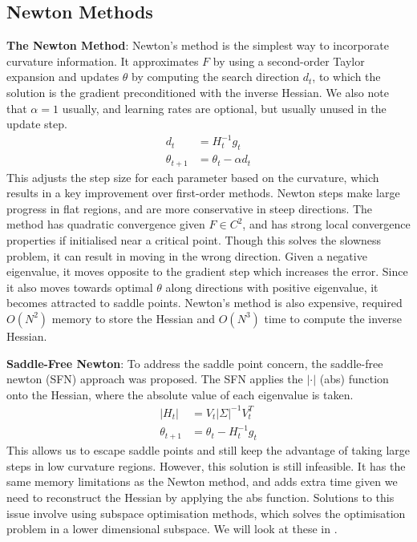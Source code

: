 \subsection{Newton Methods}
\textbf{The Newton Method}: Newton's method is the simplest way to incorporate curvature information. It approximates $F$ by using a second-order Taylor expansion and updates $\theta$ by computing the search direction $d_t$, to which the solution is the gradient preconditioned with the inverse Hessian. We also note that $\alpha = 1$ usually, and learning rates are optional, but usually unused in the update step.
\begin{align}
    d_t &= H_t^{-1} g_t \\
    \theta_{t+1} &= \theta_t - \alpha d_t
\end{align}
This adjusts the step size for each parameter based on the curvature, which results in a key improvement over first-order methods. Newton steps make large progress in flat regions, and are more conservative in steep directions. The method has quadratic convergence given $F \in C^{2}$, and has strong local convergence properties if initialised near a critical point. Though this solves the slowness problem, it can result in moving in the wrong direction. Given a negative eigenvalue, it moves opposite to the gradient step which increases the error. Since it also moves towards optimal $\theta$ along directions with positive eigenvalue, it becomes attracted to saddle points.
Newton's method is also expensive, required $O(N^2)$ memory to store the Hessian and $O(N^3)$ time to compute the inverse Hessian.

\textbf{Saddle-Free Newton}: To address the saddle point concern, the saddle-free newton (SFN) approach was proposed. The SFN applies the $|\cdot|$ (abs) function onto the Hessian, where the absolute value of each eigenvalue is taken.
\begin{align}
    |H_t| &= V_{t} |\Sigma|^{-1} V_{t}^T \\
    \theta_{t+1} &= \theta_t - H_t^{-1} g_t
\end{align}
This allows us to escape saddle points and still keep the advantage of taking large steps in low curvature regions. However, this solution is still infeasible. It has the same memory limitations as the Newton method, and adds extra time given we need to reconstruct the Hessian by applying the abs function. Solutions to this issue involve using subspace optimisation methods, which solves the optimisation problem in a lower dimensional subspace. We will look at these in .

